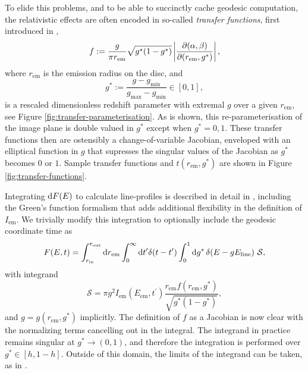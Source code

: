 
To elide this problems, and to be able to succinctly cache geodesic computation, the relativistic effects are often encoded in so-called \emph{transfer functions}, first introduced in \cite{cunningham_effects_1975},
\begin{equation}
    f:=\frac{g}{\pi r_\text{em}} \sqrt{g^\ast(1 - g^\ast)} \left\lvert \frac{\partial (\alpha, \beta)}{\partial (r_\text{em}, g^\ast)} \right\rvert,
\end{equation}
where $r_\text{em}$ is the emission radius on the disc, and
\begin{equation}
    g^\ast := \frac{g - g_\text{min}}{g_\text{max} - g_\text{min}} \in [0, 1],
\end{equation}
is a rescaled dimensionless redshift parameter with extremal $g$ over a given $r_\text{em}$, see Figure \ref{fig:transfer-parameterisation}. As is shown, this re-parameterisation of the image plane is double valued in $g^\ast$ except when $g^\ast = 0, 1$. These transfer functions then are ostensibly a change-of-variable Jacobian, enveloped with an elliptical function in $g$ that supresses the singular values of the Jacobian as $g^\ast$ becomes $0$ or $1$. Sample transfer functions and $t(r_\text{em}, g^\ast)$ are shown in Figure \ref{fig:transfer-functions}.

Integrating $\text{d} F(E)$ to calculate line-profiles is described in detail in \cite{dauser_broad_2010}, including the Green's function formalism that adds additional flexibility in the definition of $I_\text{em}$. We trivially modify this integration to optionally include the geodesic coordinate time as
\begin{equation}
    F(E, t) =
    \int_{r_\text{in}}^{r_\text{out}} \text{d} r_\text{em} \int_0^\infty \text{d} t^\prime \delta(t - t^\prime) \int_0^1 \text{d} g^\ast\, \delta(E - gE_\text{line})\,  \, \mathcal{S},
\end{equation}
with integrand
\begin{equation}
    \mathcal{S} = \pi g^2 I_\text{em}\left(E_\text{em}, t^\prime\right) \frac{r_\text{em} f(r_\text{em}, g^\ast)}{\sqrt{g^\ast (1 - g^\ast)}},
\end{equation}
and $g = g( r_\text{em}, g^\ast)$ implicitly. The definition of $f$ as a Jacobian is now clear with the normalizing terms cancelling out in the integral. The integrand in practice remains singular at $g^\ast \rightarrow (0, 1)$, and therefore the integration is performed over $g^\ast \in [h, 1 - h]$. Outside of this domain, the limits of the integrand can be taken, as in \cite{dauser_broad_2010}.


